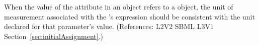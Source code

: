 When the value of the attribute  in an \InitialAssignment
object refers to a \Parameter object, the unit of measurement associated
with the \InitialAssignment's  expression should be consistent
with the unit declared for that parameter's value.  (References: L2V2 SBML
L3V1 Section~\ref{sec:initialAssignment}.)
